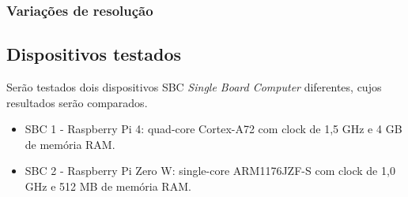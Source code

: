 \subsubsection{Variações de resolução}

\subsection{Dispositivos testados}

Serão testados dois dispositivos SBC \textit{Single Board Computer} diferentes, cujos resultados serão comparados.

\begin{itemize}
    \item SBC 1 - Raspberry Pi 4: quad-core Cortex-A72 com clock de 1,5 GHz e 4 GB de memória RAM. 
    \item SBC 2 - Raspberry Pi Zero W: single-core ARM1176JZF-S com clock de 1,0 GHz e 512 MB de memória RAM.
\end{itemize}

